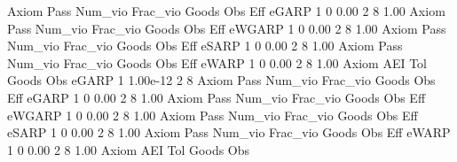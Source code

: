 {\smallskip}
       Axiom {\VBAR} Pass     Num_vio    Frac_vio       Goods         Obs         Eff  
       eGARP {\VBAR}    1           0        0.00           2           8        1.00  
{\smallskip}
{\smallskip}
{\smallskip}
       Axiom {\VBAR} Pass     Num_vio    Frac_vio       Goods         Obs         Eff  
      eWGARP {\VBAR}    1           0        0.00           2           8        1.00  
{\smallskip}
{\smallskip}
{\smallskip}
       Axiom {\VBAR} Pass     Num_vio    Frac_vio       Goods         Obs         Eff  
       eSARP {\VBAR}    1           0        0.00           2           8        1.00  
{\smallskip}
{\smallskip}
{\smallskip}
       Axiom {\VBAR} Pass     Num_vio    Frac_vio       Goods         Obs         Eff  
       eWARP {\VBAR}    1           0        0.00           2           8        1.00  
{\smallskip}
       Axiom {\VBAR}       AEI        Tol      Goods        Obs 
       eGARP {\VBAR}         1   1.00e-12          2          8 
{\smallskip}
{\smallskip}
{\smallskip}
       Axiom {\VBAR} Pass     Num_vio    Frac_vio       Goods         Obs         Eff  
       eGARP {\VBAR}    1           0        0.00           2           8        1.00  
{\smallskip}
{\smallskip}
{\smallskip}
       Axiom {\VBAR} Pass     Num_vio    Frac_vio       Goods         Obs         Eff  
      eWGARP {\VBAR}    1           0        0.00           2           8        1.00  
{\smallskip}
{\smallskip}
{\smallskip}
       Axiom {\VBAR} Pass     Num_vio    Frac_vio       Goods         Obs         Eff  
       eSARP {\VBAR}    1           0        0.00           2           8        1.00  
{\smallskip}
{\smallskip}
{\smallskip}
       Axiom {\VBAR} Pass     Num_vio    Frac_vio       Goods         Obs         Eff  
       eWARP {\VBAR}    1           0        0.00           2           8        1.00  
{\smallskip}
       Axiom {\VBAR}       AEI        Tol      Goods        Obs 
